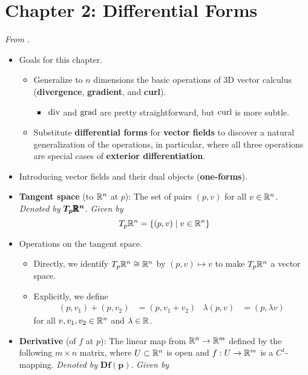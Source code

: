 \documentclass[../notes.tex]{subfiles}
\begin{document}
\section{Chapter 2: Differential Forms}
\emph{From \textcite{bib:DifferentialForms}.}
\begin{itemize}
    \item {}Goals for this chapter.
    \begin{itemize}
        \item Generalize to $n$ dimensions the basic operations of 3D vector calculus (\textbf{divergence}, \textbf{gradient}, and \textbf{curl}).
        \begin{itemize}
            \item $\operatorname{div}$ and $\operatorname{grad}$ are pretty straightforward, but $\operatorname{curl}$ is more subtle.
        \end{itemize}
        \item Substitute \textbf{differential forms} for \textbf{vector fields} to discover a natural generalization of the operations, in particular, where all three operations are special cases of \textbf{exterior differentiation}.
    \end{itemize}
    \item Introducing vector fields and their dual objects (\textbf{one-forms}).
    \item \textbf{Tangent space} (to $\mathbb{R}^n$ at $p$): The set of pairs $(p,v)$ for all $v\in\mathbb{R}^n$. \emph{Denoted by} $\bm{T_p\pmb{\mathbb{R}}^n}$. \emph{Given by}
    \begin{equation*}
        T_p\mathbb{R}^n = \{(p,v)\mid v\in\mathbb{R}^n\}
    \end{equation*}
    \item Operations on the tangent space.
    \begin{itemize}
        \item Directly, we identify $T_p\mathbb{R}^n\cong\mathbb{R}^n$ by $(p,v)\mapsto v$ to make $T_p\mathbb{R}^n$ a vector space.
        \item Explicitly, we define
        \begin{align*}
            (p,v_1)+(p,v_2) &= (p,v_1+v_2)&
            \lambda(p,v) &= (p,\lambda v)
        \end{align*}
        for all $v,v_1,v_2\in\mathbb{R}^n$ and $\lambda\in\mathbb{R}$.
    \end{itemize}
    \item \textbf{Derivative} (of $f$ at $p$): The linear map from $\mathbb{R}^n\to\mathbb{R}^m$ defined by the following $m\times n$ matrix, where $U\subset\mathbb{R}^n$ is open and $f:U\to\mathbb{R}^m$ is a $C^1$-mapping. \emph{Denoted by} $\bm{Df(p)}$. \emph{Given by}

\end{itemize}
\end{document}
